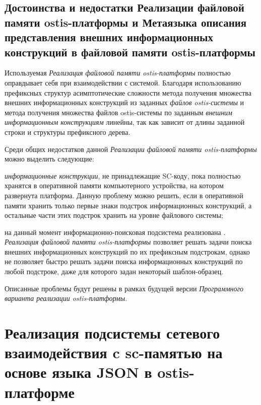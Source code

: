 \subsection{Достоинства и недостатки Реализации файловой памяти ostis-платформы и Метаязыка описания представления внешних информационных конструкций в файловой памяти ostis-платформы}
\label{sec_soft_platform_scfin_code_problems}

Используемая \textit{Реализация файловой памяти ostis-платформы} полностью оправдывает себя при взаимодействии с системой. Благодаря использованию префиксных структур асимптотические сложности метода получения множества внешних информационных конструкций из заданных \textit{файлов ostis-системы} и метода получения множества файлов ostis-системы по заданным \textit{внешним информационным конструкциям} линейны, так как зависит от длины заданной строки и структуры префиксного дерева.

Среди общих недостатков данной \textit{Реализации файловой памяти ostis-платформы} можно выделить следующие:
\begin{textitemize}
    \item \textit{информационные конструкции}, не принадлежащие SC-коду, пока полностью хранятся в оперативной памяти компьютерного устройства, на котором развернута платформа. Данную проблему можно решить, если в оперативной памяти хранить только первые знаки подстрок информационных конструкций, а остальные части этих подстрок хранить на уровне файлового системы;
    \item на данный момент информационно-поисковая подсистема реализована . \textit{Реализация файловой памяти ostis-платформы} позволяет  решать задачи поиска внешних информационных конструкций по их префиксным подстрокам, однако не позволяет быстро решать задачи поиска информационных конструкций по любой подстроке, даже для которого задан некоторый шаблон-образец.
\end{textitemize}

Описанные проблемы будут решены в рамках будущей версии \textit{Программного варианта реализации ostis-платформы}.

\section{Реализация подсистемы сетевого взаимодействия c sc-памятью на основе языка JSON в ostis-платформе}
\label{sec_soft_platform_sc_server_subsystem}

